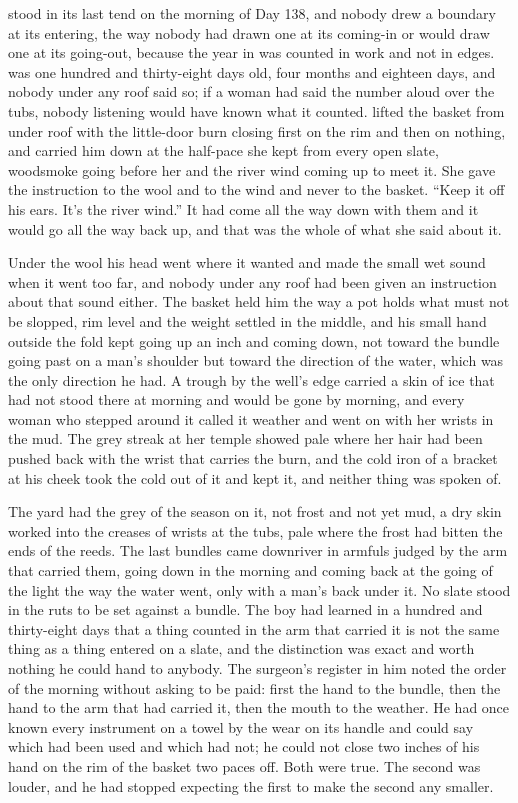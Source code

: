 
 stood in its last tend on the morning of Day 138, and nobody drew a boundary at its entering, the way nobody had drawn one at its coming-in or would draw one at its going-out, because the year in  was counted in work and not in edges.  was one hundred and thirty-eight days old, four months and eighteen days, and nobody under any roof said so; if a woman had said the number aloud over the tubs, nobody listening would have known what it counted.  lifted the basket from under  roof with the little-door burn closing first on the rim and then on nothing, and carried him down at the half-pace she kept from every open slate, woodsmoke going before her and the river wind coming up to meet it. She gave the instruction to the wool and to the wind and never to the basket. “Keep it off his ears. It's the river wind.” It had come all the way down with them and it would go all the way back up, and that was the whole of what she said about it.

Under the wool his head went where it wanted and made the small wet sound when it went too far, and nobody under any roof had been given an instruction about that sound either. The basket held him the way a pot holds what must not be slopped, rim level and the weight settled in the middle, and his small hand outside the fold kept going up an inch and coming down, not toward the bundle going past on a man's shoulder but toward the direction of the water, which was the only direction he had. A trough by the well's edge carried a skin of ice that had not stood there at morning and would be gone by morning, and every woman who stepped around it called it weather and went on with her wrists in the mud. The grey streak at her temple showed pale where her hair had been pushed back with the wrist that carries the burn, and the cold iron of a bracket at his cheek took the cold out of it and kept it, and neither thing was spoken of.

The yard had the grey of the season on it, not frost and not yet mud, a dry skin worked into the creases of wrists at the tubs, pale where the frost had bitten the ends of the reeds. The last bundles came downriver in armfuls judged by the arm that carried them, going down in the morning and coming back at the going of the light the way the water went, only with a man's back under it. No slate stood in the ruts to be set against a bundle. The boy had learned in a hundred and thirty-eight days that a thing counted in the arm that carried it is not the same thing as a thing entered on a slate, and the distinction was exact and worth nothing he could hand to anybody. The surgeon's register in him noted the order of the morning without asking to be paid: first the hand to the bundle, then the hand to the arm that had carried it, then the mouth to the weather. He had once known every instrument on a towel by the wear on its handle and could say which had been used and which had not; he could not close two inches of his hand on the rim of the basket two paces off. Both were true. The second was louder, and he had stopped expecting the first to make the second any smaller.

